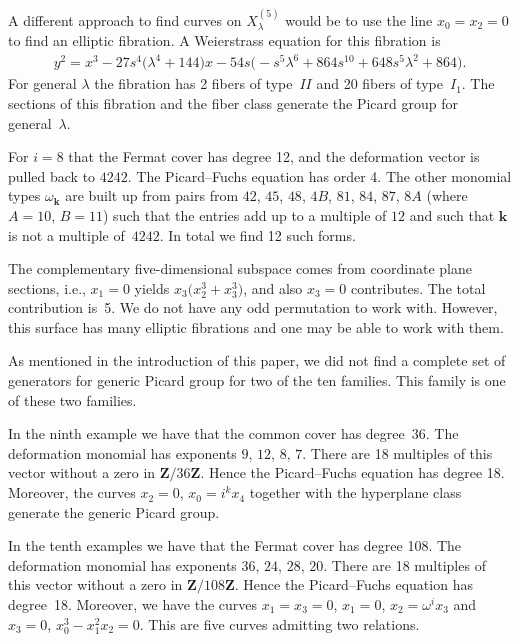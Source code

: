 \documentclass[pdftex]{sigma}
\numberwithin{equation}{section}
\begin{document}
\begin{Example}
A dif\/ferent approach to f\/ind curves on $X_{\lambda}^{(5)}$ would be to use the line $x_0=x_2=0$ to f\/ind an elliptic f\/ibration. A Weierstrass equation for this f\/ibration is
 \begin{gather*} y^2=x^3 -27s^4\big(\lambda^4+144\big)x-54s\big({-}s^5\lambda^6+864s^{10}+648s^5\lambda^2+864\big).\end{gather*}
For general $\lambda$ the f\/ibration has 2 f\/ibers of type~$II$ and 20 f\/ibers of type~$I_1$. The sections of this f\/ibration and the f\/iber class generate the Picard group for general~$\lambda$.
 \end{Example}

\begin{Example} For $i=8$ that the Fermat cover has degree 12, and the deformation vector is pulled back to $4242$. The Picard--Fuchs equation has order 4. The other monomial types $\omega_{\mathbf{k}}$ are built up from pairs from $42$, $45$, $48$, $4B$, $81$, $84$, $87$, $8A$ (where $A=10$, $B=11$) such that the entries add up to a multiple of $12$ and such that $\mathbf{k}$ is not a multiple of~$4242$. In total we f\/ind 12 such forms.

The complementary f\/ive-dimensional subspace comes from coordinate plane sections, i.e., $x_1=0$ yields $x_3\big(x_2^3+x_3^3\big)$, and also $x_3=0$ contributes. The total contribution is~5. We do not have any odd permutation to work with. However, this surface has many elliptic f\/ibrations and one may be able to work with them.

As mentioned in the introduction of this paper, we did not f\/ind a complete set of generators for generic Picard group for two of the ten families. This family is one of these two families.
\end{Example}

\begin{Example} In the ninth example we have that the common cover has degree~36. The deformation monomial has exponents $9$, $12$, $8$, $7$. There are 18 multiples of this vector without a zero in $\mathbf{Z}/36\mathbf{Z}$. Hence the Picard--Fuchs equation has degree 18. Moreover, the curves $x_2=0$, $x_0=i^kx_4$ together with the hyperplane class generate the generic Picard group.
\end{Example}

\begin{Example} In the tenth examples we have that the Fermat cover has degree 108. The deformation monomial has exponents $36$, $24$, $28$, $20$. There are 18 multiples of this vector without a zero in $\mathbf{Z}/108\mathbf{Z}$. Hence the Picard--Fuchs equation has degree~18. Moreover, we have the curves $x_1=x_3=0$, $x_1=0$, $x_2=\omega^i x_3$ and $x_3=0$, $x_0^3-x_1^2x_2=0$. This are f\/ive curves admitting two relations.
\end{Example}
\end{document}
